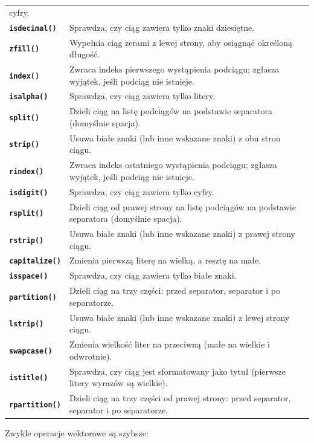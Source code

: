 \documentclass[
  polish,
  letterpaper,
  DIV=11,
  numbers=noendperiod]{scrreprt}
\begin{document}
{\begin{longtable}[]{@{}
  >{\raggedright\arraybackslash}p{}
  >{\raggedright\arraybackslash}p{}@{}}
cyfry. \\
\textbf{\texttt{isdecimal()}} & Sprawdza, czy ciąg zawiera tylko znaki
dziesiętne. \\
\textbf{\texttt{zfill()}} & Wypełnia ciąg zerami z lewej strony, aby
osiągnąć określoną długość. \\
\textbf{\texttt{index()}} & Zwraca indeks pierwszego wystąpienia
podciągu; zgłasza wyjątek, jeśli podciąg nie istnieje. \\
\textbf{\texttt{isalpha()}} & Sprawdza, czy ciąg zawiera tylko
litery. \\
\textbf{\texttt{split()}} & Dzieli ciąg na listę podciągów na podstawie
separatora (domyślnie spacja). \\
\textbf{\texttt{strip()}} & Usuwa białe znaki (lub inne wskazane znaki)
z obu stron ciągu. \\
\textbf{\texttt{rindex()}} & Zwraca indeks ostatniego wystąpienia
podciągu; zgłasza wyjątek, jeśli podciąg nie istnieje. \\
\textbf{\texttt{isdigit()}} & Sprawdza, czy ciąg zawiera tylko cyfry. \\
\textbf{\texttt{rsplit()}} & Dzieli ciąg od prawej strony na listę
podciągów na podstawie separatora (domyślnie spacja). \\
\textbf{\texttt{rstrip()}} & Usuwa białe znaki (lub inne wskazane znaki)
z prawej strony ciągu. \\
\textbf{\texttt{capitalize()}} & Zmienia pierwszą literę na wielką, a
resztę na małe. \\
\textbf{\texttt{isspace()}} & Sprawdza, czy ciąg zawiera tylko białe
znaki. \\
\textbf{\texttt{partition()}} & Dzieli ciąg na trzy części: przed
separator, separator i po separatorze. \\
\textbf{\texttt{lstrip()}} & Usuwa białe znaki (lub inne wskazane znaki)
z lewej strony ciągu. \\
\textbf{\texttt{swapcase()}} & Zmienia wielkość liter na przeciwną (małe
na wielkie i odwrotnie). \\
\textbf{\texttt{istitle()}} & Sprawdza, czy ciąg jest sformatowany jako
tytuł (pierwsze litery wyrazów są wielkie). \\
\textbf{\texttt{rpartition()}} & Dzieli ciąg na trzy części od prawej
strony: przed separator, separator i po separatorze. \\
\end{longtable}
}

Zwykle operacje wektorowe są szybsze:
\end{document}
